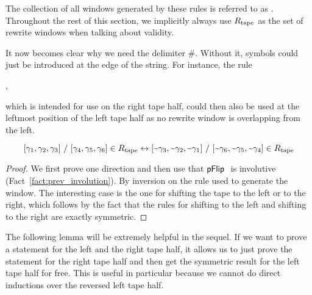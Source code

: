 The collection of all windows generated by these rules is referred to as \mnotec{$\Rtape$}.
Throughout the rest of this section, we implicitly always use $\Rtape$ as the set of rewrite windows when talking about validity.

\begin{remark}
  It now becomes clear why we need the delimiter $\#$. Without it, symbols could just be introduced at the edge of the string. For instance, the rule 
  \begin{center}
    ,
  \end{center}
  which is intended for use on the right tape half, could then also be used at the leftmost position of the left tape half as no rewrite window is overlapping from the left.
\end{remark}

\begin{lemma}\label{lem:symm_rtape}
  \[[\gamma_1, \gamma_2, \gamma_3]~/~[\gamma_4, \gamma_5, \gamma_6] \in R_{\text{tape}} \leftrightarrow [\text{\textasciitilde}\gamma_3, \text{\textasciitilde}\gamma_2, \text{\textasciitilde}\gamma_1]~/~[\text{\textasciitilde}\gamma_6, \text{\textasciitilde}\gamma_5, \text{\textasciitilde}\gamma_4] \in R_{\text{tape}} \]
\end{lemma}
\begin{proof}
  We first prove one direction and then use that $\pFlip$ is involutive (Fact~\ref{fact:prev_involution}).
  By inversion on the rule used to generate the window. The interesting case is the one for shifting the tape to the left or to the right, which follows by the fact that the rules for shifting to the left and shifting to the right are exactly symmetric. 
\end{proof}

The following lemma will be extremely helpful in the sequel.
If we want to prove a statement for the left and the right tape half, it allows us to just prove the statement for the right tape half and then get the symmetric result for the left tape half for free. This is useful in particular because we cannot do direct inductions over the reversed left tape half. 


